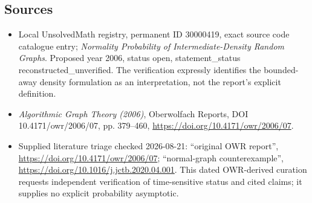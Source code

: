 \documentclass[11pt]{article}
\begin{document}
\subsection{Sources}
\begin{itemize}
\item Local UnsolvedMath registry, permanent ID 30000419, exact source code catalogue entry; \emph{Normality Probability of Intermediate-Density Random Graphs}. Proposed year 2006, status open, statement\_status reconstructed\_unverified. The verification expressly identifies the bounded-away density formulation as an interpretation, not the report's explicit definition.
\item \emph{Algorithmic Graph Theory (2006)}, Oberwolfach Reports, DOI 10.4171/owr/2006/07, pp. 379--460, \url{https://doi.org/10.4171/owr/2006/07}.
\item Supplied literature triage checked 2026-08-21: ``original OWR report'', \url{https://doi.org/10.4171/owr/2006/07}; ``normal-graph counterexample'', \url{https://doi.org/10.1016/j.jctb.2020.04.001}. This dated OWR-derived curation requests independent verification of time-sensitive status and cited claims; it supplies no explicit probability asymptotic.
\end{itemize}
\end{document}
